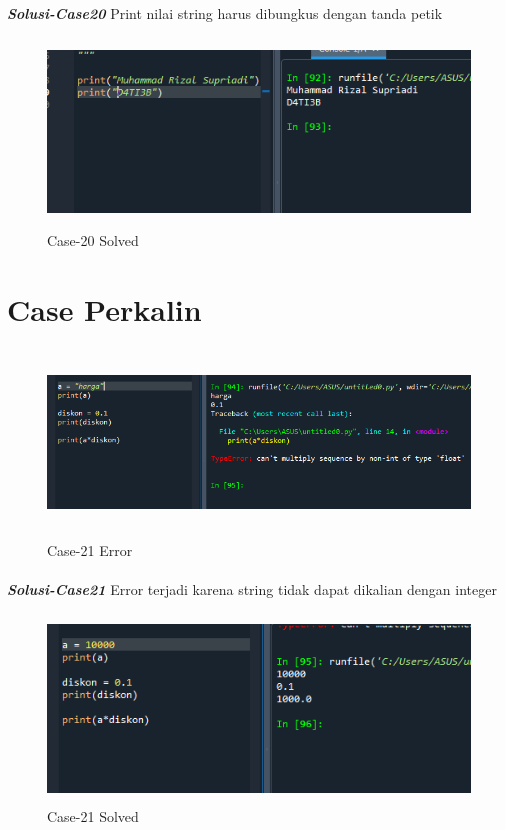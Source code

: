 \documentclass[12pt,a4paper]{article}
\begin{document}
\paragraph{}\textbf{\textit{Solusi-Case20}} {Print nilai string harus dibungkus dengan tanda petik}
\begin{figure}[ht]
    \centerline{\includegraphics[width=15cm,height=5cm]{image/case20-solved.png}}
    \renewcommand{\figurename}{Gambar}
    \caption{Case-20 Solved}
\end{figure}

\newpage
\section{Case Perkalin}
\begin{figure}[ht]
    \centerline{\includegraphics[width=15cm,height=5cm]{image/case21.png}}
    \renewcommand{\figurename}{Gambar}
    \caption{Case-21 Error}
\end{figure}
\paragraph{}\textbf{\textit{Solusi-Case21}} {Error terjadi karena string tidak dapat dikalian dengan integer}
\begin{figure}[ht]
    \centerline{\includegraphics[width=15cm,height=5cm]{image/case21-solved.png}}
    \renewcommand{\figurename}{Gambar}
    \caption{Case-21 Solved}
\end{figure}
\end{document}
